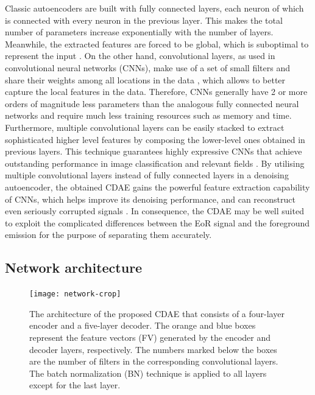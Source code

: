 \documentclass[fleqn,usenatbib]{mnras}
\begin{document}
Classic autoencoders are built with fully connected layers, each neuron of
which is connected with every neuron in the previous layer.
This makes the total number of parameters increase exponentially with the
number of layers.
Meanwhile, the extracted features are forced to be global, which
is suboptimal to represent the input \citep[e.g.,][]{masci2011}.
On the other hand, convolutional layers, as used in convolutional neural
networks (CNNs),
make use of a set of small filters and share their weights among
all locations in the data \citep[e.g.,][]{lecun1998}, which allows to
better capture the local features in the data.
Therefore, CNNs generally have 2 or more orders of magnitude less
parameters than the analogous fully connected neural networks
\citep[e.g.,][]{grais2017}
and require much less training resources such as memory and time.
Furthermore, multiple convolutional layers can be easily stacked to extract
sophisticated higher level features by composing the lower-level ones
obtained in previous layers.
This technique guarantees highly expressive CNNs that achieve
outstanding performance in image classification and relevant fields
\citep[e.g.,][]{krizhevsky2012,simonyan2014,szegedy2015,ma2019}.
By utilising multiple convolutional layers instead of fully connected
layers in a denoising autoencoder, the obtained CDAE gains the powerful
feature extraction capability of CNNs, which helps improve its denoising
performance, and can reconstruct even seriously corrupted signals
\citep[e.g.,][]{du2017}.
In consequence, the CDAE may be well suited to exploit the complicated
differences between the EoR signal and the foreground emission
for the purpose of separating them accurately.


\subsection{Network architecture}
\label{sec:architecture}

\begin{figure}
  \centering
  \texttt{[image: network-crop]}
  \caption{\label{fig:network}%
    The architecture of the proposed CDAE that consists of a four-layer
    encoder and a five-layer decoder.
    The orange and blue boxes represent the feature vectors (FV) generated
    by the encoder and decoder layers, respectively.
    The numbers marked below the boxes are the number of filters in the
    corresponding convolutional layers.
    The batch normalization (BN) technique is applied to all layers except
    for the last layer.
  }
\end{figure}
\end{document}
